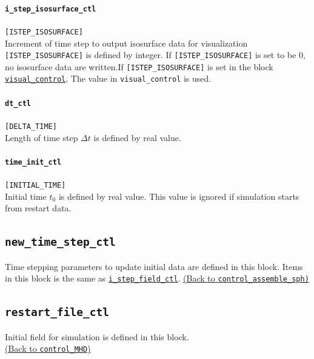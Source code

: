 \paragraph{\tt i\_step\_isosurface\_ctl}
\label{href_t:i_step_isosurface_ctl}
\verb|[ISTEP_ISOSURFACE]| \\
Increment of time step to output isosurface data for visualization \verb|[ISTEP_ISOSURFACE]| is defined by integer. If \verb|[ISTEP_ISOSURFACE]| is set to be 0, no isosurface data are written.If \verb|[ISTEP_ISOSURFACE]| is set in the block \hyperref[href_i:visual_control]{\tt visual\_control}, The value in {\tt visual\_control} is used.

\paragraph{\tt dt\_ctl}
\label{href_t:dt_ctl}
\verb|[DELTA_TIME]| \\
Length of time step $\Delta t$ is defined by real value.

\paragraph{\tt time\_init\_ctl}
\label{href_t:time_init_ctl}
\verb|[INITIAL_TIME]| \\
Initial time $t_{0}$ is defined by real value. This value is ignored if simulation starts from restart data.

\subsection{\tt new\_time\_step\_ctl}
\label{href_t:new_time_step_ctl}
Time stepping parameters to update initial data are defined in this block. Items in this block is the same as \hyperref[href_t:i_step_field_ctl]{\tt i\_step\_field\_ctl}.
\hyperref[href_i:new_time_step_ctl]{(Back to {\tt control\_assemble\_sph)}}


\subsection{\tt restart\_file\_ctl}
\label{href_t:restart_file_ctl}
Initial field for simulation is defined in this block.\\
\hyperref[href_t:restart_file_prefix]{(Back to {\tt control\_MHD})}

